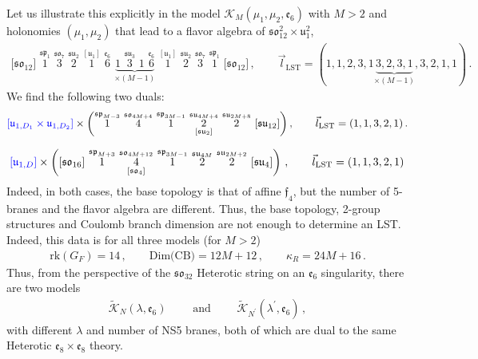 \documentclass[11pt]{article}
\numberwithin{equation}{section}
\newcommand{\fu}{\mathfrak{u}}
\newcommand{\fso}{\mathfrak{so}}
\newcommand{\fe}{\mathfrak{e}}
\newcommand{\LST}{\text{LST}\xspace}
\begin{document}
Let us illustrate this explicitly in the model $\mathcal{K}_{M}(\mu_{1},\mu_{2},\mathfrak{e}_{6})$ with $M>2$ and holonomies $(\mu_{1},\mu_{2})$ that lead to a flavor algebra of $\mathfrak{so}_{12}^{2} \times \fu_1^{2}$,
\begin{align}
\lbrack  \mathfrak{so}_{12}\rbrack     \, \,   
{\overset{\mathfrak{sp}_{1}}{1}}   \, \,  
{\overset{\mathfrak{so}_{7}}{3}}  \, \,
{\overset{\mathfrak{su}_2}{2}} \, \,     
{\overset{{{{\left[\mathfrak{u}_{1}\right]}}}}{1}} \, \,
{\overset{\mathfrak{e}_{6}}{6}}   \, \,
\underbrace{{1 \, \,
\overset{\mathfrak{su}_{3}}{3}} \, \,
1 \, \,
{\overset{\mathfrak{e}_6}{6}}}_{\times (M-1)}  \, \,    
{\overset{{{{\left[\mathfrak{u}_{1}\right]}}}}{1}} \, \,
{\overset{\mathfrak{su}_{2}}{2}}   \, \, 
{\overset{\mathfrak{so}_{7}}{3}}   \, \, 
{\overset{\mathfrak{sp}_{1}}{1}}   \, \, 
\lbrack \mathfrak{so}_{12} \rbrack   \, ,   \qquad 
\nonumber
\vec{l}_{\LST}=(1, 1, 2,3,1 \underbrace{3,2,3,1}_{\times (M-1)},3,2,1,1) \, .
\end{align}
We find the following two duals:
\begin{align}     
\label{eq:dual1}
\textcolor{blue}{\lbrack  \mathfrak{u}_{1,D_{1}} \times \mathfrak{u}_{1,D_{2}}\rbrack } \times \bigg( 
{\overset{\mathfrak{sp}_{M-3}}{1}} \, \,
{\overset{\mathfrak{so}_{4M+4}}{4}} \, \,  
{\overset{\mathfrak{sp}_{3M-1}}{1}}  \, \, 
\underset{\left[\mathfrak{su}_{2}\right]}
{\overset{\mathfrak{su}_{4M+4}}{2}} \, \,
{\overset{\mathfrak{su}_{2M+8}}{2}}  \, \,     
\lbrack \mathfrak{su}_{12} \rbrack \bigg)   \, ,   \qquad \vec{l}_{\LST}=(1,1,3, 2,1) \, .
\end{align}

\begin{align}
\textcolor{blue}{\lbrack  \mathfrak{u}_{1,D}\rbrack } \times \left( 
\lbrack  \mathfrak{so}_{16}\rbrack     \, \,   
{\overset{\mathfrak{sp}_{M+3}}{1}}   \, \,  
{\underset{\left[\mathfrak{so}_{4}\right]}{\overset{\mathfrak{so}_{4M+12}}{4}}} \, \, 
{\overset{\mathfrak{sp}_{3M-1}}{1}}  \, \,
{\overset{\mathfrak{su}_{4M}}{2}} \, \, 
{\overset{\mathfrak{su}_{2M+2}}{2}} \, \, 
\lbrack \mathfrak{su}_{4} \rbrack \right)  \, ,   \qquad 
\vec{l}_{\LST}=(1, 1,3,2,1) \, 
\end{align}
Indeed, in both cases, the base topology is that of affine $\mathfrak{f}_{4}$, but the number of 5-branes and the flavor algebra are different. Thus, the base topology, 2-group structures and Coulomb branch dimension are not enough to determine an LST. Indeed, this data is for all three models (for $M>2$)
\begin{align}
\text{rk}(G_F)=14\, , \qquad     \text{Dim(CB)}=12M +12 \, , \qquad \kappa_{R}=24M+16\, .
\end{align}
Thus, from the perspective of the $\fso_{32}$ Heterotic string on an $\fe_6$ singularity, there are two models 
\begin{align}
    \tilde{\mathcal{K}}_N ( \lambda, \fe_6) \qquad \text{ and } \qquad \tilde{\mathcal{K}}_{N^\prime}(\lambda^\prime, \fe_6) \, ,
\end{align}
with different $\lambda$ and number of NS5 branes, both of which are dual to the same Heterotic $\fe_8 \times \fe_8$ theory. 
\end{document}
